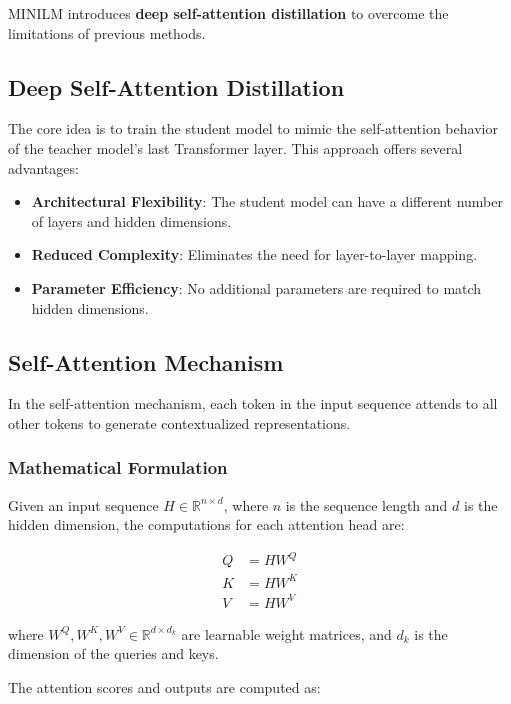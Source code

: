 \documentclass{article}
\begin{document}
MINILM introduces \textbf{deep self-attention distillation} to overcome the limitations of previous methods.  
  
\subsection{Deep Self-Attention Distillation}  
  
The core idea is to train the student model to mimic the self-attention behavior of the teacher model's last Transformer layer. This approach offers several advantages:  
  
\begin{itemize}  
    \item \textbf{Architectural Flexibility}: The student model can have a different number of layers and hidden dimensions.  
    \item \textbf{Reduced Complexity}: Eliminates the need for layer-to-layer mapping.  
    \item \textbf{Parameter Efficiency}: No additional parameters are required to match hidden dimensions.  
\end{itemize}  
  
\subsection{Self-Attention Mechanism}  
  
In the self-attention mechanism, each token in the input sequence attends to all other tokens to generate contextualized representations.  
  
\subsubsection{Mathematical Formulation}  
  
Given an input sequence $H \in \mathbb{R}^{n \times d}$, where $n$ is the sequence length and $d$ is the hidden dimension, the computations for each attention head are:  
  
\begin{align}  
    Q &= H W^Q \\  
    K &= H W^K \\  
    V &= H W^V  
\end{align}  
  
where $W^Q, W^K, W^V \in \mathbb{R}^{d \times d_k}$ are learnable weight matrices, and $d_k$ is the dimension of the queries and keys.  
  
The attention scores and outputs are computed as:  
  
\end{document}
